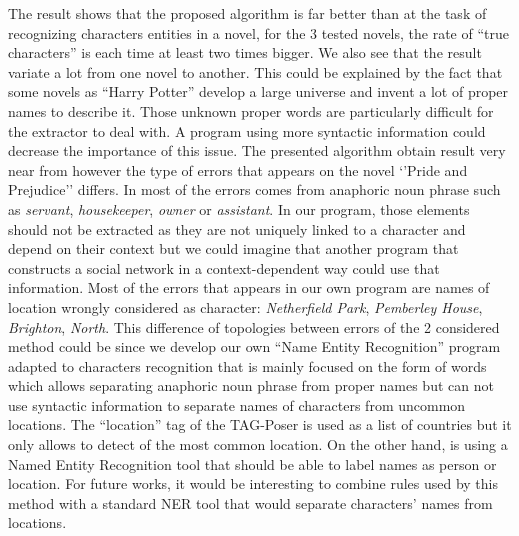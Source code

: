 \documentclass[a4paper, 12pt]{report}
\begin{document}
\begin{table}
\center
\caption{Number of detected character that refers to actual characters(true positive).}\label{tab1}

\end{table}

The result shows that the proposed algorithm is far better than \cite{original} at the task of recognizing characters entities in a
novel, for the 3 tested novels, the rate of ``true characters'' is each time at least two times bigger. We also see that the result variate
a lot from one novel to another.
This could be explained by the fact that some novels as ``Harry Potter'' develop a large universe and invent a lot of proper names to describe it.
Those unknown proper words are particularly difficult for the extractor to deal with. A program using more syntactic information could decrease the importance of this issue.
The presented algorithm obtain result very near from \cite{character_meta} however the type of errors that appears on the novel `'Pride and Prejudice'' differs.
In \cite{character_meta} most of the errors comes from anaphoric noun phrase such as \textit{servant}, \textit{housekeeper}, \textit{owner} or \textit{assistant}.
In our program, those elements should not be extracted as they are not uniquely linked to a character and depend on their context but we could imagine that another program that constructs a social network in a context-dependent way could use that information.
Most of the errors that appears in our own program are names of location wrongly considered as character: \textit{Netherfield Park}, \textit{Pemberley House}, \textit{Brighton}, \textit{North}.
This difference of topologies between errors of the 2 considered method could be since
we develop our own ``Name Entity Recognition'' program adapted to characters recognition that is mainly focused on the form of words which allows separating anaphoric noun phrase
from proper names but can not use syntactic information to separate names of characters from uncommon locations.
The ``location'' tag of the TAG-Poser is used as a list of countries but it only allows to detect of the most common location.
On the other hand, \cite{structure_clustering} is using a Named Entity Recognition tool that should be able to label names as person or location.
For future works, it would be interesting to combine rules used by this method with a standard NER tool that would separate characters' names from locations. \\
\end{document}
